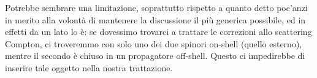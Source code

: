 \documentclass[../main.tex]{subfiles}
\begin{document}
\begin{itemize}
        \begin{nota}
            Potrebbe sembrare una limitazione, soprattutto rispetto a quanto detto poc'anzi in merito alla volontà di mantenere la discussione il più generica possibile, ed in effetti da un lato lo è: se dovessimo trovarci a trattare le correzioni allo scattering Compton, ci troveremmo con solo uno dei due spinori on-shell (quello esterno), mentre il secondo è chiuso in un propagatore off-shell. Questo ci impedirebbe di inserire tale oggetto nella nostra trattazione.\\


\end{nota}
\end{itemize}
\end{document}
